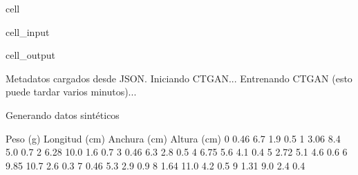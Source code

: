 \documentclass[a4paper,10pt,spanish]{jupyterBook}
\begin{document}
\begin{sphinxuseclass}{cell}
\begin{sphinxVerbatimInput}
\begin{sphinxuseclass}{cell_input}
\begin{sphinxVerbatim}[commandchars=\\\{\}]
  
   
\end{sphinxVerbatim}

\end{sphinxuseclass}\end{sphinxVerbatimInput}
\begin{sphinxVerbatimOutput}

\begin{sphinxuseclass}{cell_output}
\begin{sphinxVerbatim}[commandchars=\\\{\}]
Metadatos cargados desde JSON.
Iniciando CTGAN...
Entrenando CTGAN (esto puede tardar varios minutos)...
\end{sphinxVerbatim}

\begin{sphinxVerbatim}[commandchars=\\\{\}]
Generando datos sintéticos
\end{sphinxVerbatim}

\begin{sphinxVerbatim}[commandchars=\\\{\}]
   Peso (g)  Longitud (cm)  Anchura (cm)  Altura (cm)
0      0.46            6.7           1.9          0.5
1      3.06            8.4           5.0          0.7
2      6.28           10.0           1.6          0.7
3      0.46            6.3           2.8          0.5
4      6.75            5.6           4.1          0.4
5      2.72            5.1           4.6          0.6
6      9.85           10.7           2.6          0.3
7      0.46            5.3           2.9          0.9
8      1.64           11.0           4.2          0.5
9      1.31            9.0           2.4          0.4
\end{sphinxVerbatim}


\end{sphinxuseclass}
\end{sphinxVerbatimOutput}
\end{sphinxuseclass}
\end{document}
